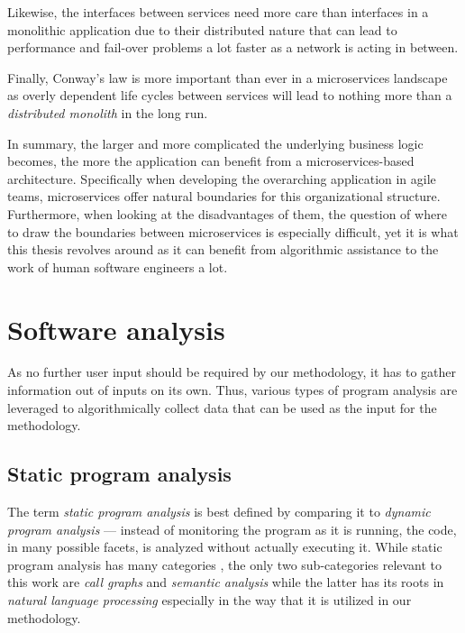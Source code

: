 \documentclass[12pt,a4paper]{report}
\begin{document}
Likewise, the interfaces between services need more care than interfaces in a
monolithic application due to their distributed nature that can lead to
performance and fail-over problems a lot faster as a network is acting
in between.

Finally, Conway's law \cite{conway1968law} is more important than ever
in a microservices landscape as overly dependent life cycles between services
will lead to nothing more than a \textit{distributed monolith} in the long run.
\newline


\noindent In summary, the larger and more complicated the underlying business logic
becomes, the more the application can benefit from a microservices\hyp based architecture.
Specifically when developing the overarching application in agile teams,
microservices offer natural boundaries for this organizational structure.
Furthermore, when looking at the disadvantages of them, the question of where
to draw the boundaries between microservices is especially difficult,
yet it is what this thesis revolves around as it can benefit from
algorithmic assistance to the work of human software engineers a lot.



\section{Software analysis} \label{sect:background-program-analysis}

As no further user input should be required by our methodology,
it has to gather information out of inputs on its own.
Thus, various types of program analysis are leveraged to
algorithmically collect data that can be used as the input for the methodology.


\subsection{Static program analysis}

The term \textit{static program analysis} is best defined by comparing it
to \textit{dynamic program analysis} --- instead of monitoring the program
as it is running, the code, in many possible facets, is analyzed without
actually executing it. While static program analysis has many categories
\cite{woegerer2005static}, the only two sub-categories relevant to this work
are \textit{call graphs} and \textit{semantic analysis} while the
latter has its roots in \textit{natural language processing} especially in
the way that it is utilized in our methodology.
\end{document}

